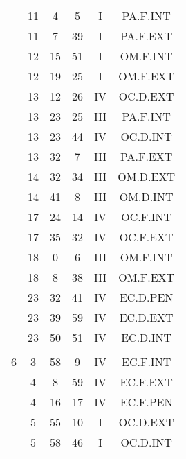 \documentclass[12pt, a4paper]{article}
\begin{document}
\begin{multicols}{3}
{\begin{tabular}{c c c c c c}
	 	 	 	 & 11 & 4 & 5 & I & PA.F.INT\\%
	 	 	 	 & 11 & 7 & 39 & I & PA.F.EXT\\%
	 	 	 	 & 12 & 15 & 51 & I & OM.F.INT\\%
	 	 	 	 & 12 & 19 & 25 & I & OM.F.EXT\\%
	 	 	 	 & 13 & 12 & 26 & IV & OC.D.EXT\\%
	 	 	 	 & 13 & 23 & 25 & III & PA.F.INT\\%
	 	 	 	 & 13 & 23 & 44 & IV & OC.D.INT\\%
	 	 	 	 & 13 & 32 & 7 & III & PA.F.EXT\\%
	 	 	 	 & 14 & 32 & 34 & III & OM.D.EXT\\%
	 	 	 	 & 14 & 41 & 8 & III & OM.D.INT\\%
	 	 	 	 & 17 & 24 & 14 & IV & OC.F.INT\\%
	 	 	 	 & 17 & 35 & 32 & IV & OC.F.EXT\\%
	 	 	 	 & 18 & 0 & 6 & III & OM.F.INT\\%
	 	 	 	 & 18 & 8 & 38 & III & OM.F.EXT\\%
	 	 	 	 & 23 & 32 & 41 & IV & EC.D.PEN\\%
	 	 	 	 & 23 & 39 & 59 & IV & EC.D.EXT\\%
	 	 	 	 & 23 & 50 & 51 & IV & EC.D.INT\\%
	 	 	 	 & & & & & \\%
	 	 	 	6 & 3 & 58 & 9 & IV & EC.F.INT\\%
	 	 	 	 & 4 & 8 & 59 & IV & EC.F.EXT\\%
	 	 	 	 & 4 & 16 & 17 & IV & EC.F.PEN\\%
	 	 	 	 & 5 & 55 & 10 & I & OC.D.EXT\\%
	 	 	 	 & 5 & 58 & 46 & I & OC.D.INT\\%

\end{tabular}}
\end{multicols}
\end{document}
